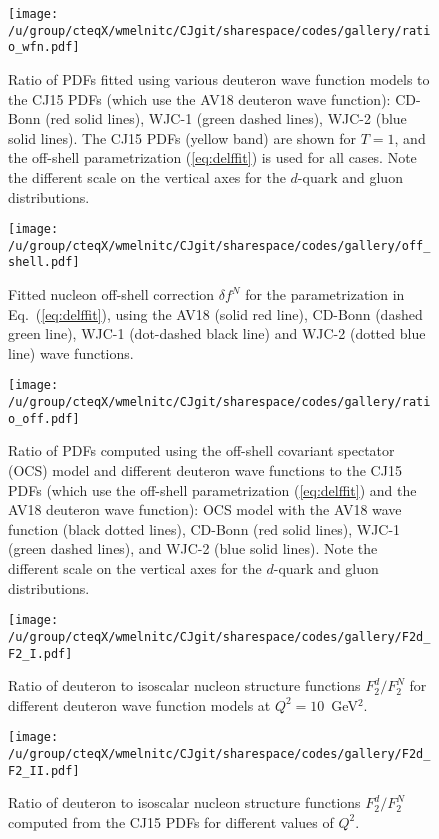 \documentclass[aps,prd,amsmath,preprint]{revtex4}
\begin{document}
\begin{figure}[t]
\texttt{[image: /u/group/cteqX/wmelnitc/CJgit/sharespace/codes/gallery/ratio\_wfn.pdf]}
\caption{Ratio of PDFs fitted using various deuteron wave function models
	to the CJ15 PDFs (which use the AV18 deuteron wave function):
	CD-Bonn (red solid lines),
	WJC-1 (green dashed lines),
	WJC-2 (blue solid lines).
	The CJ15 PDFs (yellow band) are shown for $T=1$, and the
	off-shell parametrization (\ref{eq:delffit}) is used for
	all cases.  Note the different scale on the vertical axes
	for the	$d$-quark and gluon distributions.}
\label{fig:ratio_wfn}
\end{figure} 


\begin{figure}[t]
\texttt{[image: /u/group/cteqX/wmelnitc/CJgit/sharespace/codes/gallery/off\_shell.pdf]}
\caption{Fitted nucleon off-shell correction $\delta f^N$ for the
	parametrization in Eq.~(\ref{eq:delffit}), using the
	AV18 (solid red line), CD-Bonn (dashed green line),
	WJC-1 (dot-dashed black line) and WJC-2 (dotted blue line)
	wave functions.}
\label{fig:off_shell}
\end{figure} 


\begin{figure}[t]
\texttt{[image: /u/group/cteqX/wmelnitc/CJgit/sharespace/codes/gallery/ratio\_off.pdf]}
\caption{Ratio of PDFs computed using the off-shell covariant spectator
	(OCS) model and different deuteron wave functions to the CJ15
	PDFs (which use the off-shell parametrization (\ref{eq:delffit})
	and the AV18 deuteron wave function):
	OCS model with the AV18 wave function (black dotted lines),
	CD-Bonn (red solid lines),
	WJC-1 (green dashed lines), and
	WJC-2 (blue solid lines).
	Note the different scale on the vertical axes for the
	$d$-quark and gluon distributions.}
\label{fig:ratio_off}
\end{figure} 


\begin{figure}[t]
\texttt{[image: /u/group/cteqX/wmelnitc/CJgit/sharespace/codes/gallery/F2d\_F2\_I.pdf]}
\caption{Ratio of deuteron to isoscalar nucleon structure functions
	$F_2^d/F_2^N$ for different deuteron wave function models
	at $Q^2=10$~GeV$^2$.}
\label{fig:F2dN}
\end{figure}


\begin{figure}[t]
\texttt{[image: /u/group/cteqX/wmelnitc/CJgit/sharespace/codes/gallery/F2d\_F2\_II.pdf]}
\caption{Ratio of deuteron to isoscalar nucleon structure functions
	$F_2^d/F_2^N$ computed from the CJ15 PDFs for different
	values of $Q^2$.}
\label{fig:F2dN_Q2}
\end{figure}
\end{document}
